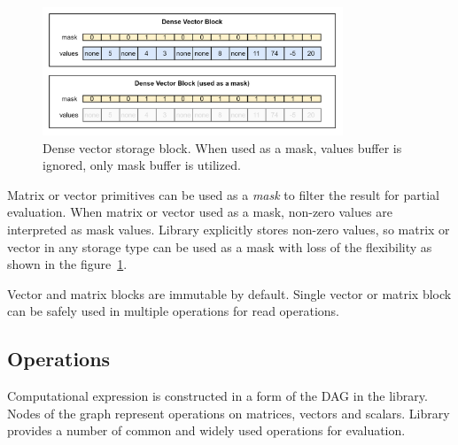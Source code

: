 \begin{figure}
    \centering
    \includegraphics[width=0.8\textwidth]{images/vector_dense_block.png}
    \caption{Dense vector storage block. When used as a mask, values buffer is ignored, only mask buffer is utilized.}
    \label{fig:dense_vec_block}
\end{figure}

Matrix or vector primitives can be used as a \textit{mask} to filter the result for partial evaluation. When matrix or vector used as a mask, non-zero values are interpreted as mask values. Library explicitly stores non-zero values, so matrix or vector in any storage type can be used as a mask with loss of the flexibility as shown in the figure~\ref{fig:dense_vec_block}.

Vector and matrix blocks are immutable by default. Single vector or matrix block can be safely used in multiple operations for read operations.

\subsection{Operations}

Computational expression is constructed in a form of the DAG in the library. Nodes of the graph represent operations on matrices, vectors and scalars. Library provides a number of common and widely used operations for evaluation.


